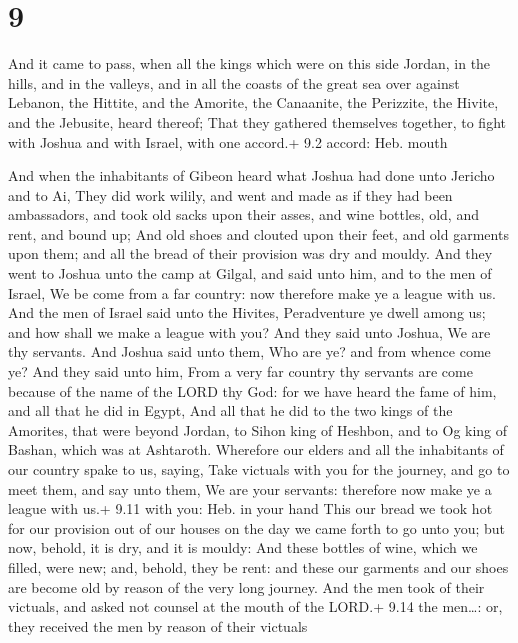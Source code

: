 \hypertarget{section-8}{%
\section{9}\label{section-8}}

 And it came to pass, when all the kings which were on this
side Jordan, in the hills, and in the valleys, and in all the coasts of
the great sea over against Lebanon, the Hittite, and the Amorite, the
Canaanite, the Perizzite, the Hivite, and the Jebusite, heard thereof;
 That they gathered themselves together, to fight with
Joshua and with Israel, with one accord.+ 9.2 accord: Heb. mouth

 And when the inhabitants of Gibeon heard what Joshua had
done unto Jericho and to Ai,  They did work wilily, and went
and made as if they had been ambassadors, and took old sacks upon their
asses, and wine bottles, old, and rent, and bound up;  And
old shoes and clouted upon their feet, and old garments upon them; and
all the bread of their provision was dry and mouldy.  And
they went to Joshua unto the camp at Gilgal, and said unto him, and to
the men of Israel, We be come from a far country: now therefore make ye
a league with us.  And the men of Israel said unto the
Hivites, Peradventure ye dwell among us; and how shall we make a league
with you?  And they said unto Joshua, We are thy servants.
And Joshua said unto them, Who are ye? and from whence come ye?
 And they said unto him, From a very far country thy
servants are come because of the name of the LORD thy God: for we have
heard the fame of him, and all that he did in Egypt,  And
all that he did to the two kings of the Amorites, that were beyond
Jordan, to Sihon king of Heshbon, and to Og king of Bashan, which was at
Ashtaroth.  Wherefore our elders and all the inhabitants of
our country spake to us, saying, Take victuals with you for the journey,
and go to meet them, and say unto them, We are your servants: therefore
now make ye a league with us.+ 9.11 with you: Heb. in your hand
 This our bread we took hot for our provision out of our
houses on the day we came forth to go unto you; but now, behold, it is
dry, and it is mouldy:  And these bottles of wine, which we
filled, were new; and, behold, they be rent: and these our garments and
our shoes are become old by reason of the very long journey.
 And the men took of their victuals, and asked not counsel
at the mouth of the LORD.+ 9.14 the men\ldots: or, they received the men
by reason of their victuals

